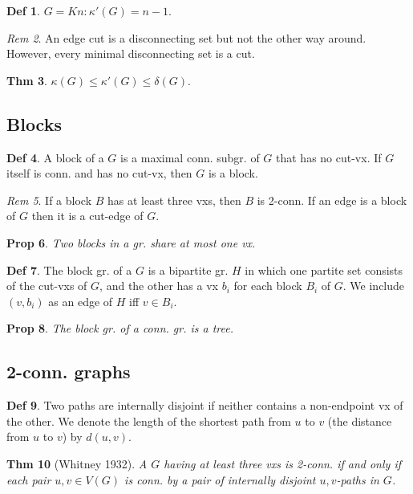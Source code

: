 \documentclass[11pt, fleqn, a4paper, landscape]{article}
\theoremstyle{plain} %
\newtheorem{thm}{Thm}
\newtheorem{pro}[thm]{Prop}
\theoremstyle{remark} %
\newtheorem{rem}[thm]{Rem}
\theoremstyle{definition} %
\newtheorem{defi}[thm]{Def}
\begin{document}
\begin{multicols}{5}
\begin{defi}
$G = Kn: \kappa'(G) = n - 1.$
\end{defi}
\addtocounter{thm}{1}
\begin{rem}
An edge cut is a disconnecting set but not the other way around. However, every minimal disconnecting set is a cut.
\end{rem}

\begin{thm}
$\kappa (G) \le \kappa'(G) \le \delta(G).$
\end{thm}

\subsection{Blocks}
\begin{defi}
A block of a $G$ is a maximal conn. subgr. of $G$ that has no cut-vx.
If $G$ itself is conn. and has no cut-vx, then $G$ is a block.
\end{defi}
\addtocounter{thm}{1}
\begin{rem}
If a block $B$ has at least three vxs, then $B$ is 2-conn. If an edge is a block of $G$ then it is a cut-edge of $G$.
\end{rem}

\begin{pro}
Two blocks in a gr. share at most one vx.
\end{pro}

\begin{defi}
The block gr. of a $G$ is a bipartite gr. $H$ in which one partite set consists of the cut-vxs of $G$, and the other has a vx $b_i$ for each block $B_i$ of $G$. We include $(v, b_i)$ as an edge of $H$ iff $v \in B_i.$
\end{defi}
\addtocounter{thm}{1}
\begin{pro}
The block gr. of a conn. gr. is a tree.
\end{pro}

\subsection{2-conn. graphs}

\begin{defi}
Two paths are internally disjoint if neither contains a non-endpoint vx of the other. We denote the length of the shortest path from $u$ to $v$ (the distance from $u$ to $v$) by $d(u, v)$.
\end{defi}

\begin{thm}[Whitney 1932]
A $G$ having at least three vxs is 2-conn. if and only
if each pair $u, v \in V (G)$ is conn. by a pair of internally disjoint $u, v$-paths in $G$.
\end{thm}


\end{multicols}
\end{document}
